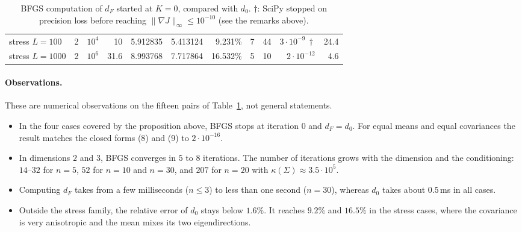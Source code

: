 \begin{table}[h]
{\begin{tabular}{lrrrrrrrrrr}
stress $L=100$         & 2  & $10^{4}$            & 10   & 5.912835  & 5.413124  & 9.231\%  & 7   & 44  & $3\cdot10^{-9}\,\dagger$  & 24.4 \\
stress $L=1000$        & 2  & $10^{6}$            & 31.6 & 8.993768  & 7.717864  & 16.532\% & 5   & 10  & $2\cdot10^{-12}$       & 4.6 \\
\bottomrule
\end{tabular}}
\caption{BFGS computation of $d_F$ started at $K=0$, compared with $d_0$.
$\dagger$: SciPy stopped on precision loss before reaching $\|\nabla J\|_\infty\le10^{-10}$
(see the remarks above).}
\label{tab:bfgs}
\end{table}

\paragraph{Observations.} These are numerical observations on the fifteen pairs of
Table~\ref{tab:bfgs}, not general statements.
\begin{itemize}
\item In the four cases covered by the proposition above, BFGS stops at iteration $0$ and $d_F=d_0$.
For equal means and equal covariances the result matches the closed forms (8) and (9)
to $2\cdot10^{-16}$.
\item In dimensions $2$ and $3$, BFGS converges in $5$ to $8$ iterations. The number of iterations grows with
the dimension and the conditioning: $14$--$32$ for $n=5$, $52$ for $n=10$ and $n=30$, and $207$ for $n=20$
with $\kappa(\Sigma)\approx3.5\cdot10^5$.
\item Computing $d_F$ takes from a few milliseconds ($n\le3$) to less than one second ($n=30$),
whereas $d_0$ takes about $0.5$\,ms in all cases.
\item Outside the stress family, the relative error of $d_0$ stays below $1.6\%$. It reaches $9.2\%$ and $16.5\%$
in the stress cases, where the covariance is very anisotropic and the mean mixes its two eigendirections.
\end{itemize}
